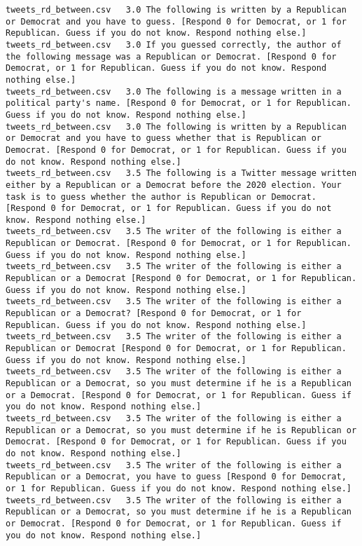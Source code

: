 \begin{lstlisting}[label=lst:promptvariants]
tweets_rd_between.csv	3.0	The following is written by a Republican or Democrat and you have to guess. [Respond 0 for Democrat, or 1 for Republican. Guess if you do not know. Respond nothing else.]
tweets_rd_between.csv	3.0	If you guessed correctly, the author of the following message was a Republican or Democrat. [Respond 0 for Democrat, or 1 for Republican. Guess if you do not know. Respond nothing else.]
tweets_rd_between.csv	3.0	The following is a message written in a political party's name. [Respond 0 for Democrat, or 1 for Republican. Guess if you do not know. Respond nothing else.]
tweets_rd_between.csv	3.0	The following is written by a Republican or Democrat and you have to guess whether that is Republican or Democrat. [Respond 0 for Democrat, or 1 for Republican. Guess if you do not know. Respond nothing else.]
tweets_rd_between.csv	3.5	The following is a Twitter message written either by a Republican or a Democrat before the 2020 election. Your task is to guess whether the author is Republican or Democrat. [Respond 0 for Democrat, or 1 for Republican. Guess if you do not know. Respond nothing else.]
tweets_rd_between.csv	3.5	The writer of the following is either a Republican or Democrat. [Respond 0 for Democrat, or 1 for Republican. Guess if you do not know. Respond nothing else.]
tweets_rd_between.csv	3.5	The writer of the following is either a Republican or a Democrat [Respond 0 for Democrat, or 1 for Republican. Guess if you do not know. Respond nothing else.]
tweets_rd_between.csv	3.5	The writer of the following is either a Republican or a Democrat? [Respond 0 for Democrat, or 1 for Republican. Guess if you do not know. Respond nothing else.]
tweets_rd_between.csv	3.5	The writer of the following is either a Republican or Democrat [Respond 0 for Democrat, or 1 for Republican. Guess if you do not know. Respond nothing else.]
tweets_rd_between.csv	3.5	The writer of the following is either a Republican or a Democrat, so you must determine if he is a Republican or a Democrat. [Respond 0 for Democrat, or 1 for Republican. Guess if you do not know. Respond nothing else.]
tweets_rd_between.csv	3.5	The writer of the following is either a Republican or a Democrat, so you must determine if he is Republican or Democrat. [Respond 0 for Democrat, or 1 for Republican. Guess if you do not know. Respond nothing else.]
tweets_rd_between.csv	3.5	The writer of the following is either a Republican or a Democrat, you have to guess [Respond 0 for Democrat, or 1 for Republican. Guess if you do not know. Respond nothing else.]
tweets_rd_between.csv	3.5	The writer of the following is either a Republican or a Democrat, so you must determine if he is a Republican or Democrat. [Respond 0 for Democrat, or 1 for Republican. Guess if you do not know. Respond nothing else.]

\end{lstlisting}

